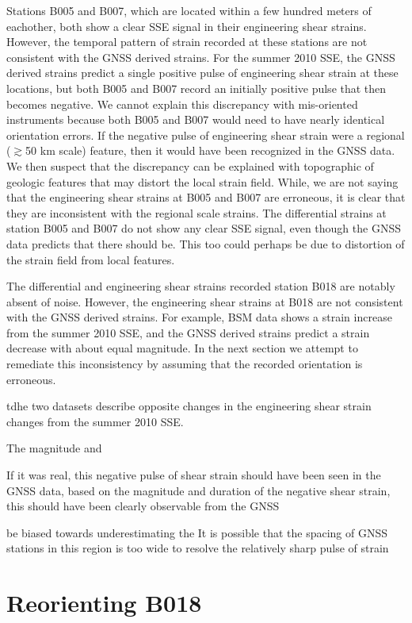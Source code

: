 \documentclass[10pt,a4paper]{article}
\begin{document}
Stations B005 and B007, which are located within a few hundred meters of eachother, both show a clear SSE signal in their engineering shear strains.  However, the temporal pattern of strain recorded at these stations are not consistent with the GNSS derived strains.  For the summer 2010 SSE, the GNSS derived strains predict a single positive pulse of engineering shear strain at these locations, but both B005 and B007 record an initially positive pulse that then becomes negative. We cannot explain this discrepancy with mis-oriented instruments because both B005 and B007 would need to have nearly identical orientation errors. If the negative pulse of engineering shear strain were a regional ($\gtrsim$50 km scale) feature, then it would have been recognized in the GNSS data. We then suspect that the discrepancy can be explained with topographic of geologic features that may distort the local strain field. While, we are not saying that the engineering shear strains at B005 and B007 are erroneous, it is clear that they are inconsistent with the regional scale strains. The differential strains at station B005 and B007 do not show any clear SSE signal, even though the GNSS data predicts that there should be. This too could perhaps be due to distortion of the strain field from local features.

The differential and engineering shear strains recorded station B018 are notably absent of noise. However, the engineering shear strains at B018 are not consistent with the GNSS derived strains. For example, BSM data shows a strain increase from the summer 2010 SSE, and the GNSS derived strains predict a strain decrease with about equal magnitude. In the next section we attempt to remediate this inconsistency by assuming that the recorded orientation is erroneous. 

tdhe two datasets describe opposite changes in the engineering shear strain changes from the summer 2010 SSE.    

    

The magnitude and    

 If it was real, this negative pulse of shear strain should have been seen in the GNSS data, based on the magnitude and duration of the negative shear strain, this  should have been clearly observable from the GNSS        

  

  be biased towards underestimating the    It is possible that the spacing of GNSS stations in this region is too wide to resolve the relatively sharp pulse of strain    


\section{Reorienting B018}     





  
 
\end{document}
